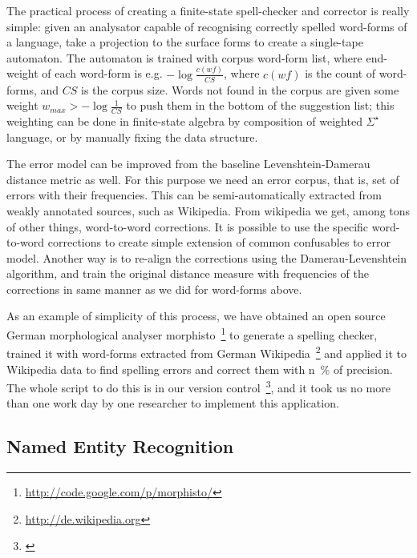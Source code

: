\documentclass{llncs}
\begin{document}
The practical process of creating a finite-state spell-checker and corrector
is really simple: given an analysator capable of recognising correctly spelled
word-forms of a language, take a projection to the surface forms to create a
single-tape automaton. The automaton is trained with corpus word-form list, 
where end-weight of each word-form is e.g. $-\log\frac{c(wf)}{CS}$, where 
$c(wf)$ is the count of word-forms, and $CS$ is the corpus size. Words not
found in the corpus are given some weight $w_{max} > -\log\frac{1}{CS}$ to
push them in the bottom of the suggestion list; this weighting can be done
in finite-state algebra by composition of weighted $\Sigma^{\star}$ language,
or by manually fixing the data structure.

The error model can be improved from the baseline Levenshtein-Damerau distance
metric as well. For this purpose we need an error corpus, that is, set of
errors with their frequencies. This can be semi-automatically extracted from
weakly annotated sources, such as Wikipedia. From wikipedia we get, among tons
of other things, word-to-word corrections. It is possible to use the specific
word-to-word corrections to create simple extension of common confusables to
error model. Another way is to re-align the corrections using the
Damerau-Levenshtein algorithm, and train the original distance measure with
frequencies of the corrections in same manner as we did for word-forms above.

As an example of simplicity of this process, we have obtained an open source
German morphological analyser
morphisto~\footnote{\url{http://code.google.com/p/morphisto/}} to generate a
spelling checker, trained it with word-forms extracted from German
Wikipedia~\footnote{\url{http://de.wikipedia.org}} and applied it to Wikipedia
data to find spelling errors and correct them with n~\% of precision. The whole
script to do this is in our version control~\footnote{\url{}}, and it took us
no more than one work day by one researcher to implement this application.

\subsection{Named Entity Recognition}
\end{document}
